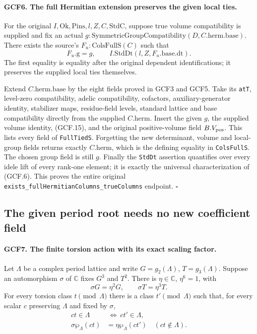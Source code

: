 \documentclass[11pt,a4paper]{article}
\numberwithin{equation}{section}
\theoremstyle{remark}\newtheorem{remark}[theorem]{Remark}
\begin{document}
\paragraph{GCF6. The full Hermitian extension preserves the given local ties.}
\label{claim:GCF6}
For the original \(I,\mathrm{Ok},\mathrm{Pins},l,Z,C,\mathrm{StdC}\),
suppose true volume compatibility is supplied and fix an actual
\(g:\mathrm{SymmetricGroupCompatibility}(D,C.\mathrm{herm.base})\).
There exists the source's \(F_u:\mathrm{ColsFullS}(C)\) such that
\[
 F_u.\mathrm{g}=g,\qquad
 I.\mathrm{StdDt}(l,Z,F_u.\mathrm{base.dt}).             \tag{GCF.16}
\]
The first equality is equality after the original dependent
identifications; it preserves the supplied local ties themselves.

Extend \(C.\mathrm{herm.base}\) by the eight fields proved in
GCF3 and GCF5.  Take its \texttt{at\allowbreak T}, level-zero compatibility,
adelic compatibility, cofactors, auxiliary-generator identity,
stabilizer maps, residue-field levels, standard lattice and base
compatibility directly from the supplied \(C.\mathrm{herm}\).
Insert the given \(g\), the supplied volume identity, (GCF.15), and
the original positive-volume field \(B.V_{\rm pos}\).
This lists every field of \texttt{Full\allowbreak Tied\allowbreak S}.  Forgetting the new
determinant, volume and local-group fields returns exactly
\(C.\mathrm{herm}\), which is the defining equality in
\texttt{Cols\allowbreak Full\allowbreak S}.  The chosen group field is still \(g\).
Finally the \texttt{Std\allowbreak Dt} assertion quantifies over every idele lift
of every rank-one element; it is exactly the universal characterization
of (GCF.6).  This proves the entire original
\texttt{exists\_\allowbreak full\allowbreak Hermitian\allowbreak Columns\_\allowbreak true\allowbreak Columns} endpoint.
\hfill\(\square\)

\subsection{The given period root needs no new coefficient field}

\paragraph{GCF7. The finite torsion action with its exact scaling factor.}
\label{claim:GCF7}
Let \(\Lambda\) be a complex period lattice and write
\(G=g_2(\Lambda)\), \(T=g_3(\Lambda)\).  Suppose an automorphism
\(\sigma\) of \(\mathbb C\) fixes \(G^3\) and \(T^2\).
There is \(\eta\in\mathbb C\), \(\eta^6=1\), with
\[
 \sigma G=\eta^2G,\qquad \sigma T=\eta^3T.             \tag{GCF.17}
\]
For every torsion class \(t\pmod\Lambda\) there is a class
\(t'\pmod\Lambda\) such that, for every scalar \(c\) preserving
\(\Lambda\) and fixed by \(\sigma\),
\[
 \begin{split}
 ct\in\Lambda&\ \Longleftrightarrow\ ct'\in\Lambda,\\
 \sigma\wp_\Lambda(ct)&=\eta\wp_\Lambda(ct')
                                      \quad(ct\notin\Lambda).
 \end{split}                                                   \tag{GCF.18}
\]
\end{document}

